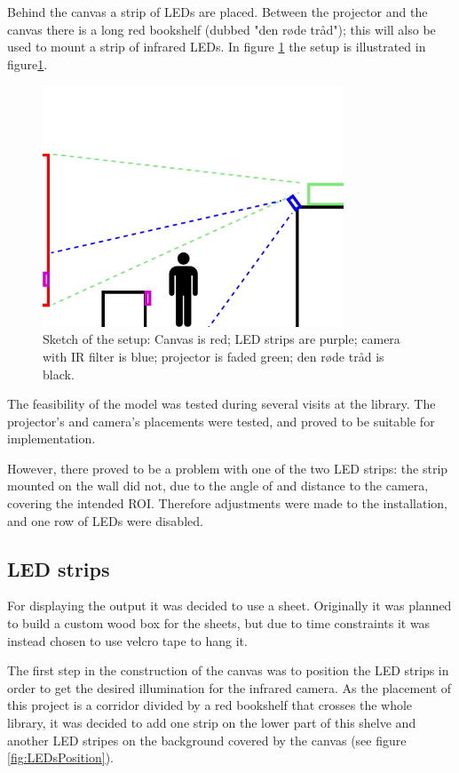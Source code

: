 Behind the canvas a strip of LEDs are placed. Between the projector and the canvas there is a long red bookshelf (dubbed "den r{\o}de tr{\aa}d"); this will also be used to mount a strip of infrared LEDs. In figure \ref{fig:setup_model} the setup is illustrated in figure\ref{fig:setup_model}.

\begin{figure}[htbp] 
\centering 
\includegraphics[width=0.8\textwidth]{Pictures/Setup/sideview_camera_with_person_two_strips.png} 
\caption{Sketch of the setup: Canvas is red; LED strips are purple; camera with IR filter is blue; projector is faded green; den r{\o}de tr{\aa}d is black.} 
\label{fig:setup_model} 
\end{figure}

The feasibility of the model was tested during several visits at the library. The projector's and camera's placements were tested, and proved to be suitable for implementation.

However, there proved to be a problem with one of the two LED strips: the strip mounted on the wall did not, due to the angle of and distance to the camera, covering the intended ROI. Therefore adjustments were made to the installation, and one row of LEDs were disabled.

\subsection{LED strips}
For displaying the output it was decided to use a sheet. Originally it was planned to build a custom wood box for the sheets, but due to time constraints it was instead chosen to use velcro tape to hang it.

The first step in the construction of the canvas was to position the LED strips in order to get the desired illumination for the infrared camera. As the placement of this project is a corridor divided by a red bookshelf that crosses the whole library, it was decided to add one strip on the lower part of this shelve and another LED stripes on the background covered by the canvas (see figure \ref{fig:LEDsPosition}).

